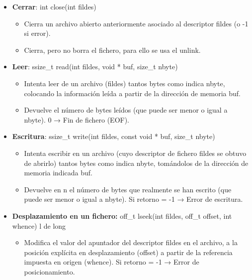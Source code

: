 \documentclass[12pt, twoside, openright]{report} %
\begin{document}
\begin{itemize}
\begin{itemize}
\begin{itemize}
      \end{itemize}
    \item \textbf{Cerrar}: int close(int fildes)
      

      \begin{itemize}
      \item Cierra un archivo abierto anteriormente asociado al descriptor
        fildes (o -1 si error).
        
      \item Cierra, pero no borra el fichero, para ello se usa el unlink.
        
      \end{itemize}
    \item \textbf{Leer}: ssize\_t read(int fildes, void * buf, size\_t
      nbyte)
      

      \begin{itemize}
      \item Intenta leer de un archivo (fildes) tantos bytes como indica
        nbyte, colocando la información leída a partir de la dirección
        de memoria buf.
        
      \item Devuelve el número de bytes leídos (que puede ser menor o igual
        a nbyte). 0 → Fin de fichero (EOF).
        
      \end{itemize}
    \item \textbf{Escritura}: ssize\_t write(int fildes, const void * buf,
      size\_t nbyte)
      

      \begin{itemize}
      \item Intenta escribir en un archivo (cuyo descriptor de fichero
        fildes se obtuvo de abrirlo) tantos bytes como indica nbyte,
        tomándolos de la dirección de memoria indicada buf.
        
      \item Devuelve en n el número de bytes que realmente se han escrito
        (que puede ser menor o igual a nbyte). Si retorno = -1 → Error
        de escritura.
        
      \end{itemize}
	  \pagebreak
    \item \textbf{Desplazamiento en un fichero:} off\_t lseek(int fildes,
      off\_t offset, int whence) l de long
      

      \begin{itemize}
      \item Modifica el valor del apuntador del descriptor fildes en el
        archivo, a la posición explícita en desplazamiento (offset) a
        partir de la referencia impuesta en origen (whence). Si retorno
        = -1 → Error de posicionamiento.
        

\end{itemize}
\end{itemize}
\end{itemize}
\end{document}
